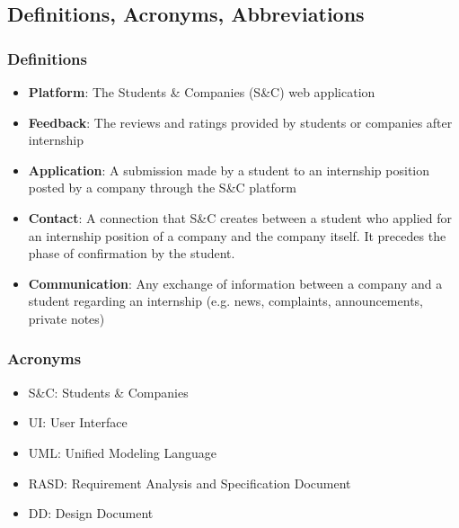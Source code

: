 
\subsection{Definitions, Acronyms, Abbreviations}

    \subsubsection{Definitions}
        \begin{itemize}
            \item \textbf{Platform}: 
            The Students \& Companies (S\&C) web application
            \item \textbf{Feedback}: 
            The reviews and ratings provided by students or companies after internship
            \item \textbf{Application}: 
            A submission made by a student to an internship position posted by a company through the S\&C platform 
            \item \textbf{Contact}: 
            A connection that S\&C creates between a student who applied for an internship position of a company and the company itself. It precedes the phase of confirmation by the student.
            \item \textbf{Communication}: 
            Any exchange of information between a company and a student regarding an internship (e.g. news, complaints, announcements, private notes)
        \end{itemize}

    
    \subsubsection{Acronyms}
        \begin{itemize}
            \item {S\&C: Students \& Companies}
            \item {UI: User Interface}
            \item {UML: Unified Modeling Language}
            \item {RASD: Requirement Analysis and Specification Document}
            \item {DD: Design Document}
        \end{itemize}
    

